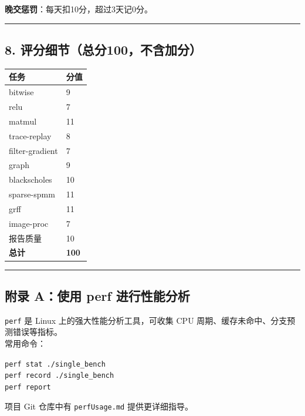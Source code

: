 \documentclass[11pt, a4paper]{article}
\begin{document}
\begin{aibox}
\textbf{晚交惩罚}：每天扣10分，超过3天记0分。

\begin{center}\rule{\textwidth}{0.4pt}\end{center}

\subsection*{8. 评分细节（总分100，不含加分）}

\vspace{0.5em}
\begin{tabularx}{0.5\textwidth}{@{} X l @{}}
\toprule
任务 & 分值 \\
\midrule
bitwise & 9 \\
relu & 7 \\
matmul & 11 \\
trace-replay & 8 \\
filter-gradient & 7 \\
graph & 9 \\
blackscholes & 10 \\
sparse-spmm & 11 \\
grff & 11 \\
image-proc & 7 \\
报告质量 & 10 \\
\midrule
\textbf{总计} & \textbf{100} \\
\bottomrule
\end{tabularx}
\vspace{0.5em}

\begin{center}\rule{\textwidth}{0.4pt}\end{center}

\subsection*{附录 A：使用 perf 进行性能分析}

\texttt{perf} 是 Linux 上的强大性能分析工具，可收集 CPU 周期、缓存未命中、分支预测错误等指标。\\
常用命令：
\begin{tcolorbox}[colback=white,colframe=gray!50!white,boxrule=0.5pt,arc=2pt,left=5pt,right=5pt,top=5pt,bottom=5pt]
\texttt{perf stat ./single\_bench}\\
\texttt{perf record ./single\_bench}\\
\texttt{perf report}
\end{tcolorbox}
项目 Git 仓库中有 \texttt{perfUsage.md} 提供更详细指导。


\end{aibox}
\end{document}
